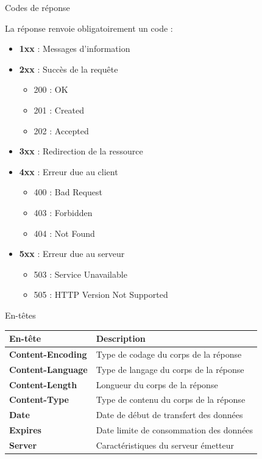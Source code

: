 \begin{frame}{Codes de réponse}

La réponse renvoie obligatoirement un code :
\begin{itemize}
   \item \textbf{1xx} : Messages d'information
   \item \textbf{2xx} : Succès de la requête
	\begin{itemize}
		\item 200 : OK
		\item 201 : Created
		\item 202 : Accepted
	\end{itemize}
   \item \textbf{3xx} : Redirection de la ressource
   \item \textbf{4xx} : Erreur due au client
	\begin{itemize}
		\item 400 : Bad Request
		\item 403 : Forbidden
		\item 404 : Not Found
	\end{itemize}
   \item \textbf{5xx} : Erreur due au serveur
	\begin{itemize}
		\item 503 : Service Unavailable
		\item 505 : HTTP Version Not Supported
	\end{itemize}
\end{itemize}

\end{frame}


\begin{frame}{En-têtes}

\begin{table}[h]
\begin{tabular}{|l|l|}
\hline
   En-tête & Description\\ \hline \hline
   \textbf{Content-Encoding} & Type de codage du corps de la réponse\\ \hline
   \textbf{Content-Language} & Type de langage du corps de la réponse\\ \hline
   \textbf{Content-Length} & Longueur du corps de la réponse\\ \hline
   \textbf{Content-Type} & Type de contenu du corps de la réponse\\ \hline
   \textbf{Date} & Date de début de transfert des données\\ \hline   
   \textbf{Expires} & Date limite de consommation des données\\ \hline
   \textbf{Server} & Caractéristiques du serveur émetteur\\ \hline
\end{tabular}
\end{table}

\end{frame}

